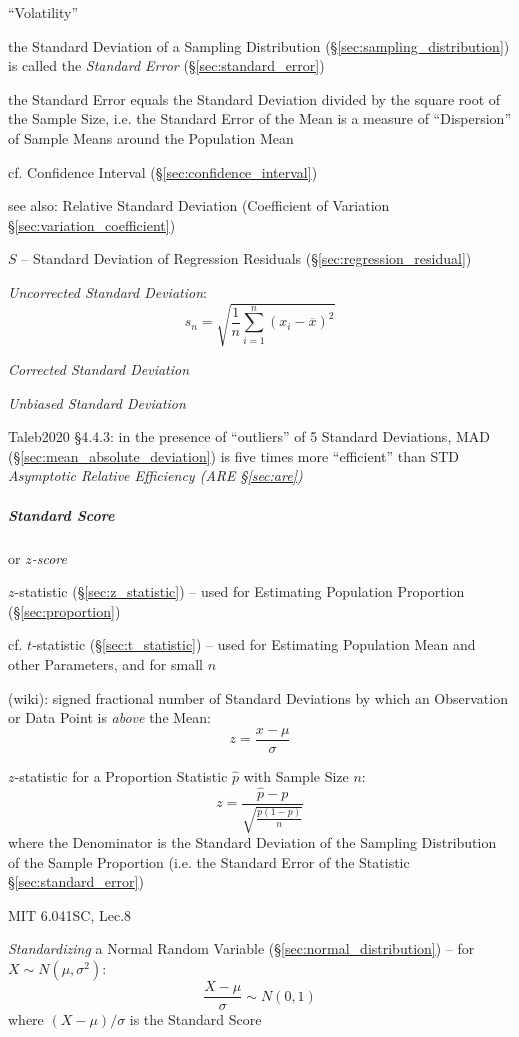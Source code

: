 ``Volatility''

the Standard Deviation of a Sampling Distribution
(\S\ref{sec:sampling_distribution}) is called the \emph{Standard Error}
(\S\ref{sec:standard_error})

the Standard Error equals the Standard Deviation divided by the square root of
the Sample Size, i.e. the Standard Error of the Mean is a measure of
``Dispersion'' of Sample Means around the Population Mean

cf. Confidence Interval (\S\ref{sec:confidence_interval})

see also: Relative Standard Deviation (Coefficient of Variation
\S\ref{sec:variation_coefficient})

$S$ -- Standard Deviation of Regression Residuals
(\S\ref{sec:regression_residual})

\emph{Uncorrected Standard Deviation}:
\[
  s_n = \sqrt{\frac{1}{n}\sum_{i=1}^n (x_i - \overline{x})^2}
\]

\emph{Corrected Standard Deviation}

\emph{Unbiased Standard Deviation}

Taleb2020 \S 4.4.3: in the presence of ``outliers'' of 5 Standard Deviations,
MAD (\S\ref{sec:mean_absolute_deviation}) is five times more ``efficient'' than
STD \fist \emph{Asymptotic Relative Efficiency (ARE \S\ref{sec:are})}



\subparagraph{Standard Score}\label{sec:standard_score}\hfill

or \emph{$z$-score}

$z$-statistic (\S\ref{sec:z_statistic}) -- used for Estimating Population
Proportion (\S\ref{sec:proportion})

cf. $t$-statistic (\S\ref{sec:t_statistic}) -- used for Estimating Population
Mean and other Parameters, and for small $n$

(wiki): signed fractional number of Standard Deviations by which an Observation
or Data Point is \emph{above} the Mean:
\[
  z = \frac{x - \mu}{\sigma}
\]

$z$-statistic for a Proportion Statistic $\hat{p}$ with Sample Size $n$:
\[
  z = \frac{\hat{p} - p}{\sqrt{\frac{p(1-p)}{n}}}
\]
where the Denominator is the Standard Deviation of the Sampling Distribution of
the Sample Proportion (i.e. the Standard Error of the Statistic
\S\ref{sec:standard_error})

MIT 6.041SC, Lec.8

\emph{Standardizing} a Normal Random Variable (\S\ref{sec:normal_distribution})
-- for $X \sim N(\mu, \sigma^2)$:
\[
  \frac{X - \mu}{\sigma} \sim N(0, 1)
\]
where $(X - \mu)/\sigma$ is the Standard Score



